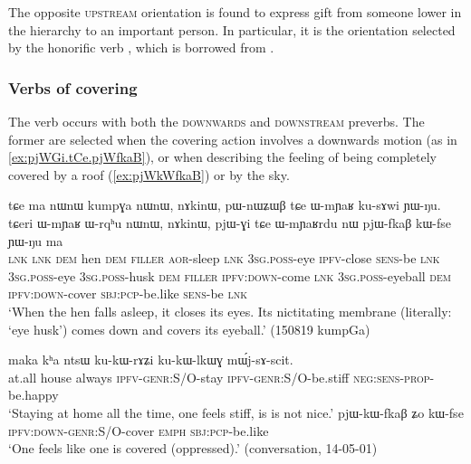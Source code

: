 The opposite \textsc{upstream} orientation is found to express gift from someone lower in the hierarchy to an important person. In particular, it is the orientation selected by the honorific verb , which is borrowed from .
 
\subsubsection{Verbs of covering} \label{sec:preverb.cover}
The verb  occurs with both the \textsc{downwards} and \textsc{downstream} preverbs. The former are selected when the covering action involves a downwards motion (as in \ref{ex:pjWGi.tCe.pjWfkaB}), or when describing the feeling of being completely covered by a roof (\ref{ex:pjWkWfkaB}) or by the sky.

\begin{exe}
\ex \label{ex:pjWGi.tCe.pjWfkaB}
\gll  tɕe ma nɯnɯ kumpɣa nɯnɯ, nɤkinɯ, pɯ-nɯʑɯβ tɕe ɯ-mɲaʁ ku-sɤwi ɲɯ-ŋu. tɕeri ɯ-mɲaʁ ɯ-rqʰu nɯnɯ, nɤkinɯ, pjɯ-ɣi tɕe ɯ-mɲaʁrdu nɯ pjɯ-fkaβ kɯ-fse ɲɯ-ŋu ma \\
\textsc{lnk} \textsc{lnk} \textsc{dem} hen \textsc{dem} \textsc{filler} \textsc{aor}-sleep \textsc{lnk} \textsc{3sg}.\textsc{poss}-eye \textsc{ipfv}-close \textsc{sens}-be \textsc{lnk} \textsc{3sg}.\textsc{poss}-eye \textsc{3sg}.\textsc{poss}-husk \textsc{dem} \textsc{filler} \textsc{ipfv}:\textsc{down}-come \textsc{lnk} \textsc{3sg}.\textsc{poss}-eyeball \textsc{dem} \textsc{ipfv}:\textsc{down}-cover \textsc{sbj}:\textsc{pcp}-be.like \textsc{sens}-be \textsc{lnk} \\
\glt `When the hen falls asleep, it closes its eyes. Its nictitating membrane (literally: `eye husk') comes down and covers its eyeball.' (150819 kumpGa) 
\end{exe}

\begin{exe}
\ex 
\begin{xlist}
\ex 
\gll maka kʰa ntsɯ ku-kɯ-rɤʑi ku-kɯ-lkɯɣ mɯ́j-sɤ-scit. \\
at.all house always \textsc{ipfv}-\textsc{genr}:S/O-stay \textsc{ipfv}-\textsc{genr}:S/O-be.stiff \textsc{neg}:\textsc{sens}-\textsc{prop}-be.happy \\
\glt `Staying at home all the time, one feels stiff, is is not nice.'
\ex \label{ex:pjWkWfkaB}
\gll pjɯ-kɯ-fkaβ ʑo kɯ-fse \\
\textsc{ipfv}:\textsc{down}-\textsc{genr}:S/O-cover \textsc{emph} \textsc{sbj}:\textsc{pcp}-be.like \\
\glt `One feels like one is covered (oppressed).' (conversation, 14-05-01)
\end{xlist}
\end{exe}

